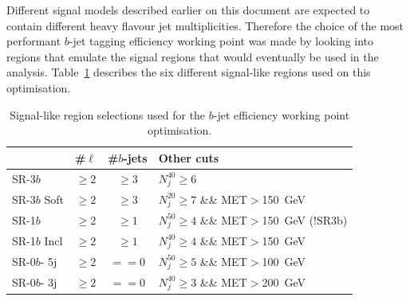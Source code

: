 Different signal models described earlier on this document are expected to contain different heavy flavour jet multiplicities.
Therefore the choice of the most performant $b$-jet tagging efficiency working point was made by looking into regions that emulate the signal regions that would eventually be used in the analysis.
Table~\ref{tab:btaggingSR} describes the six different signal-like regions used on this optimisation. 

\begin{table}[htb!]
\caption{Signal-like region selections used for the $b$-jet efficiency working point optimisation.}
\label{tab:btaggingSR}
\begin{center}
\begin{tabular}{l|c|c|l}
                & \#$\ell$ & \#$b$-jets & Other cuts                          \\ \hline \hline
  SR-3$b$       & $\geq 2$ & $\geq 3$   & $N^{40}_j \geq 6$                    \\
  SR-3$b$ Soft  & $\geq 2$ & $\geq 3$   & $N^{20}_j \geq 7$ \&\& MET$>$150~GeV \\\hline
  SR-1$b$       & $\geq 2$ & $\geq 1$   & $N^{50}_j \geq 4$ \&\& MET$>$150~GeV (!SR3b)\\
  SR-1$b$ Incl  & $\geq 2$ & $\geq 1$   & $N^{40}_j \geq 4$ \&\& MET$>$150~GeV \\\hline
  SR-0$b$- 5j   & $\geq 2$ & $== 0$     & $N^{50}_j \geq 5$ \&\& MET$>$100~GeV \\
  SR-0$b$- 3j   & $\geq 2$ & $== 0$     & $N^{40}_j \geq 3$ \&\& MET$>$200~GeV \\ \hline
\end{tabular}
\end{center}
\end{table}
         
